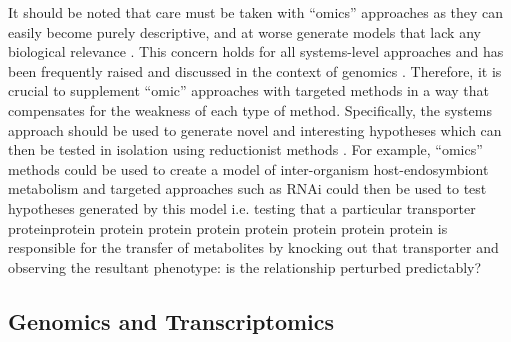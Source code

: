 It should be noted that care must be taken with ``omics'' approaches as they can easily become purely descriptive,
and at worse generate models that lack any biological relevance \citep{Fang2011}.  
This concern holds for all systems-level approaches and has been frequently raised and discussed in the context
of genomics \citep{Dougherty2008}.  Therefore, it is crucial to supplement ``omic'' approaches with targeted
methods in a way that compensates for the weakness of each type of method.
Specifically, the systems approach should be used to generate novel and interesting
hypotheses which can then be tested in isolation using reductionist methods \citep{Casadevall2008}.  
For example, ``omics'' methods could be used to create a model of inter-organism host-endosymbiont
metabolism and targeted approaches such as RNAi could then be used to test hypotheses generated
by this model i.e. testing that a particular transporter proteinprotein protein protein protein protein protein protein protein  is responsible
for the transfer of metabolites by knocking out that transporter and observing the resultant phenotype: 
is the relationship perturbed predictably?





\subsection{Genomics and Transcriptomics}

